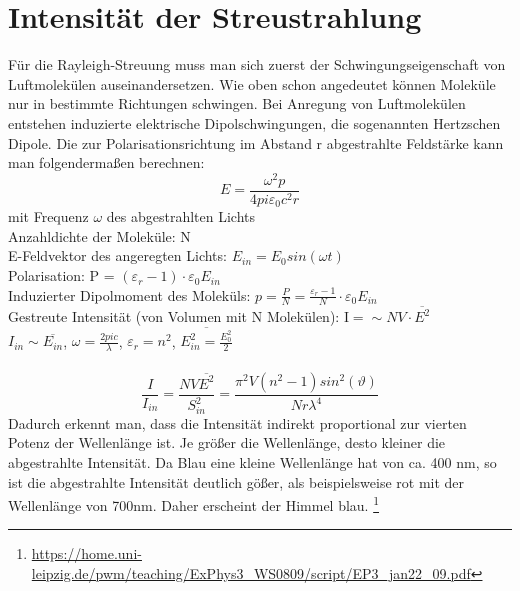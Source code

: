 \section{ Intensität der Streustrahlung}
Für die Rayleigh-Streuung muss man sich zuerst der Schwingungseigenschaft von Luftmolekülen auseinandersetzen. Wie oben schon angedeutet können Moleküle nur in bestimmte Richtungen schwingen. Bei Anregung von Luftmolekülen entstehen induzierte elektrische Dipolschwingungen, die sogenannten Hertzschen Dipole. 
Die zur Polarisationsrichtung im Abstand r abgestrahlte Feldstärke kann man folgendermaßen berechnen:
\begin{equation}
E=\frac{\omega^2p}{4pi\varepsilon_0c^2r}
\end{equation}
mit Frequenz $\omega$ des abgestrahlten Lichts\\
Anzahldichte der Moleküle: N\\
E-Feldvektor des angeregten Lichts: $E_{in}=E_0sin(\omega t)$\\
Polarisation: P = $(\varepsilon_r-1)\cdot\varepsilon_0E_{in}$\\
Induzierter Dipolmoment des Moleküls: $p=\frac{P}{N}=\frac{\varepsilon_r-1}{N}\cdot\varepsilon_0E_{in}$\\
Gestreute Intensität (von Volumen mit N Molekülen): I$=\sim NV\cdot\overline{E^2}$\\
$I_{in}\sim\overline{E_{in}}$, $\omega=\frac{2pic}{\lambda}$, $\varepsilon_r=n^2$, $\overline{E^2_{in}=\frac{E_0^2}{2}}$  \\\\
\begin{equation}
\frac{I}{I_{in}}=\frac{NV\overline{E^2}}{S^2_{in}}=\frac{\pi^2V(n^2-1)sin^2(\vartheta)}{Nr\lambda^4}
\end{equation}
Dadurch erkennt man, dass die Intensität indirekt proportional zur vierten Potenz der Wellenlänge ist. Je größer die Wellenlänge, desto kleiner die abgestrahlte Intensität. Da Blau eine kleine Wellenlänge hat von ca. 400 nm, so ist die abgestrahlte Intensität deutlich gößer, als beispielsweise rot mit der Wellenlänge von 700nm.  Daher erscheint der Himmel blau. 
\footnote{\url{https://home.uni-leipzig.de/pwm/teaching/ExPhys3_WS0809/script/EP3_jan22_09.pdf}}


